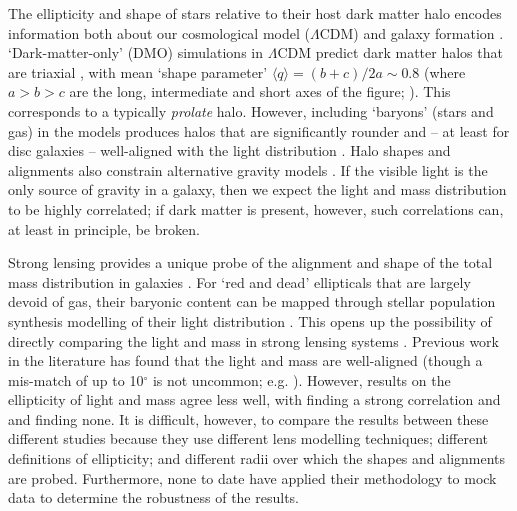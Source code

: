 \documentclass[useAMS,usenatbib]{mn2e}
\begin{document}
The ellipticity and shape of stars relative to their host dark matter halo encodes information both about our cosmological model ($\Lambda$CDM) and galaxy formation \citep[e.g.][]{1994ApJ...431..617D,2001ApJ...551..294I,2004ApJ...611L..73K,2007MNRAS.378...55M,2007arXiv0707.0737D,2012MNRAS.424L..16L,2014JPhG...41f3101R}. `Dark-matter-only' (DMO) simulations in $\Lambda$CDM predict dark matter halos that are triaxial \citep{1991ApJ...378..496D,1992ApJ...399..405W,1996ApJ...462..563N,2002ApJ...574..538J}, with mean `shape parameter' $\langle q \rangle = (b+c)/2a \sim 0.8$ (where $a > b > c$ are the long, intermediate and short axes of the figure; \citealt{2007MNRAS.378...55M}). This corresponds to a typically {\it prolate} halo. However, including `baryons' (stars and gas) in the models produces halos that are significantly rounder and -- at least for disc galaxies -- well-aligned with the light distribution \citep{1991ApJ...377..365K,1994ApJ...431..617D,2007arXiv0707.0737D}. Halo shapes and alignments also constrain alternative gravity models \citep{2001MNRAS.327..552M,2004ApJ...610L..97H,2005MNRAS.361..971R,2012PhRvD..86h3507F,2013MNRAS.434.2971D}. If the visible light is the only source of gravity in a galaxy, then we expect the light and mass distribution to be highly correlated; if dark matter is present, however, such correlations can, at least in principle, be broken.

Strong lensing provides a unique probe of the alignment and shape of the total mass distribution in galaxies \citep[e.g.][]{1986ApJ...310..568B,1992grle.book.....S,1998ApJ...509..561K,2000ApJ...543..131K,2006ApJ...649..599K,2007AJ....134..668A,2008MNRAS.383..857F,2010ApJ...724..511A,2012MNRAS.424..104L}. For `red and dead' ellipticals that are largely devoid of gas, their baryonic content can be mapped through stellar population synthesis modelling of their light distribution \citep[e.g.][]{2005ApJ...623L...5F,2006ApJ...640..662T,2008MNRAS.383..857F}. This opens up the possibility of directly comparing the light and mass in strong lensing systems \citep{1998ApJ...509..561K,2008MNRAS.383..857F,2009ApJ...690..670T,2012A&A...538A..99S}. Previous work in the literature has found that the light and mass are well-aligned (though a mis-match of up to 10$^\circ$ is not uncommon; e.g. \citealt{2012A&A...538A..99S}). However, results on the ellipticity of light and mass agree less well, with \citet{2012A&A...538A..99S} finding a strong correlation and \citet{1998ApJ...509..561K} and \citet{2008MNRAS.383..857F} finding none. It is difficult, however, to compare the results between these different studies because they use different lens modelling techniques; different definitions of ellipticity; and different radii over which the shapes and alignments are probed. Furthermore, none to date have applied their methodology to mock data to determine the robustness of the results.
\end{document}
